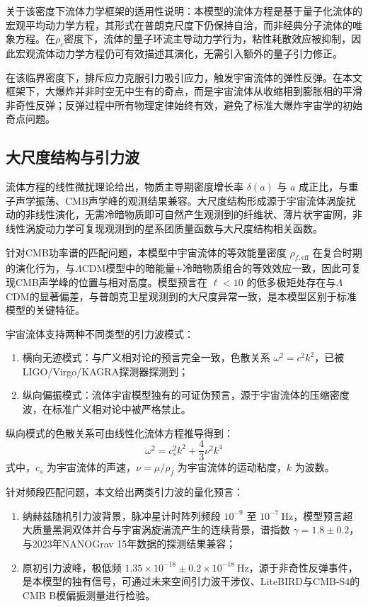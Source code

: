 \documentclass[aps,prd,preprint,superscriptaddress,floatfix,numbers,sort&compress]{revtex4-2}
\begin{document}
关于该密度下流体力学框架的适用性说明：本模型的流体方程是基于量子化流体的宏观平均动力学方程，其形式在普朗克尺度下仍保持自洽，而非经典分子流体的唯象方程。在$\rho_c$密度下，流体的量子环流主导动力学行为，粘性耗散效应被抑制，因此宏观流体动力学方程仍可有效描述其演化，无需引入额外的量子引力修正。

在该临界密度下，排斥应力克服引力吸引应力，触发宇宙流体的弹性反弹。在本文框架下，大爆炸并非时空无中生有的奇点，而是宇宙流体从收缩相到膨胀相的平滑非奇性反弹；反弹过程中所有物理定律始终有效，避免了标准大爆炸宇宙学的初始奇点问题。

\subsection{大尺度结构与引力波}
流体方程的线性微扰理论给出，物质主导期密度增长率 $\delta(a)$ 与 $a$ 成正比，与重子声学振荡、CMB声学峰的观测结果兼容。大尺度结构形成源于宇宙流体涡旋扰动的非线性演化，无需冷暗物质即可自然产生观测到的纤维状、薄片状宇宙网，非线性涡旋动力学可复现观测到的星系团质量函数与大尺度结构相关函数。

针对CMB功率谱的匹配问题，本模型中宇宙流体的等效能量密度 $\rho_{f, \mathrm{eff}}$ 在复合时期的演化行为，与$\Lambda$CDM模型中的暗能量+冷暗物质组合的等效效应一致，因此可复现CMB声学峰的位置与相对高度。模型预言在 $\ell<10$ 的低多极矩处存在与$\Lambda$CDM的显著偏差，与普朗克卫星观测到的大尺度异常一致，是本模型区别于标准模型的关键特征。

宇宙流体支持两种不同类型的引力波模式：
\begin{enumerate}
    \item 横向无迹模式：与广义相对论的预言完全一致，色散关系 $\omega^{2}=c^{2} k^{2}$，已被LIGO/Virgo/KAGRA探测器探测到；
    \item 纵向偏振模式：流体宇宙模型独有的可证伪预言，源于宇宙流体的压缩密度波，在标准广义相对论中被严格禁止。
\end{enumerate}

纵向模式的色散关系可由线性化流体方程推导得到：
\begin{equation}
\omega^{2}=c_{s}^{2} k^{2}+\frac{4}{3} \nu^{2} k^{4}
\label{eq:longitudinal_gw}
\end{equation}
式中，$c_{s}$ 为宇宙流体的声速，$\nu=\mu / \rho_{f}$ 为宇宙流体的运动粘度，$k$ 为波数。

针对频段匹配问题，本文给出两类引力波的量化预言：
\begin{enumerate}
    \item 纳赫兹随机引力波背景，脉冲星计时阵列频段 $10^{-9}$ 至 $10^{-7} \ \text{Hz}$，模型预言超大质量黑洞双体并合与宇宙涡旋湍流产生的连续背景，谱指数 $\gamma=1.8 \pm 0.2$，与2023年NANOGrav 15年数据的探测结果兼容\citep{nanograv202315yr}；
    \item 原初引力波峰，极低频 $1.35 \times 10^{-18} \pm 0.2 \times 10^{-18} \ \text{Hz}$，源于非奇性反弹事件，是本模型的独有信号，可通过未来空间引力波干涉仪、LiteBIRD与CMB-S4的CMB B模偏振测量进行检验。
\end{enumerate}
\end{document}
